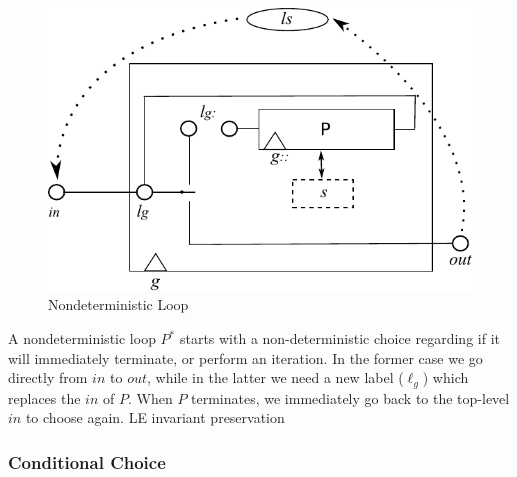 \begin{figure}
  \centering
  \includegraphics{images/kleene-star-actual}
  \caption{Nondeterministic Loop}
  \label{fig:nondet-loop}
\end{figure}

A nondeterministic loop $P^*$  starts with a non-deterministic choice
regarding if it will immediately terminate,
or perform an iteration.
In the former case we go directly from $in$ to $out$,
while in the latter we need a new label ($\ell_g$)
which replaces the $in$ of $P$.
When $P$ terminates, we immediately go back to the top-level $in$
to choose again.
LE invariant preservation


\newpage
\subsubsection{Conditional Choice}

